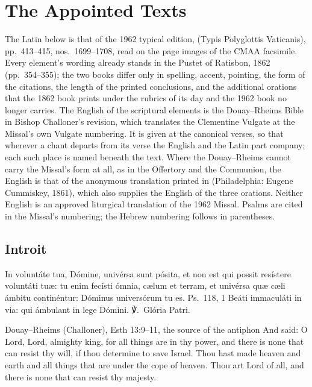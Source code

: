 \section{The Appointed Texts}
\label{sec:appointed-texts}

The Latin below is that of the 1962 typical edition, 
(Typis Polyglottis Vaticanis), pp.~413--415, nos.~1699--1708, read on the page
images of the CMAA facsimile. Every element's wording already stands in the
Pustet  of Ratisbon, 1862 (pp.~354--355); the two books
differ only in spelling, accent, pointing, the form of the citations, the length
of the printed conclusions, and the additional orations that the 1862 book
prints under the rubrics of its day and the 1962 book no longer carries. The
English of the scriptural elements is the Douay--Rheims Bible in Bishop
Challoner's revision, which translates the Clementine Vulgate at the Missal's
own Vulgate numbering. It is given at the canonical verses, so that wherever a
chant departs from its verse the English and the Latin part company; each such
place is named beneath the text. Where the Douay--Rheims cannot carry the
Missal's form at all, as in the Offertory and the Communion, the English is that
of the anonymous translation printed in  (Philadelphia: Eugene Cummiskey,
1861), which also supplies the English of the three orations. Neither English
is an approved liturgical translation of the 1962 Missal. Psalms are cited in
the Missal's numbering; the Hebrew numbering follows in parentheses.

\subsection{Introit}
\label{proper-introit}


\begin{latinproper}
In voluntáte tua, Dómine, univérsa sunt pósita, et non est qui possit
resístere voluntáti tuæ: tu enim fecísti ómnia, cælum et terram, et univérsa
quæ cæli ámbitu continéntur: Dóminus universórum tu es. \textnormal{Ps.\ 118, 1}
Beáti immaculáti in via: qui ámbulant in lege Dómini. ℣.~Glória Patri.
\end{latinproper}

\begin{englishwitness}{Douay--Rheims (Challoner), Esth 13:9--11, the source of the antiphon}
And said: O Lord, Lord, almighty king, for all things are in thy power, and
there is none that can resist thy will, if thou determine to save Israel. Thou
hast made heaven and earth and all things that are under the cope of heaven.
Thou art Lord of all, and there is none that can resist thy majesty.
\end{englishwitness}

